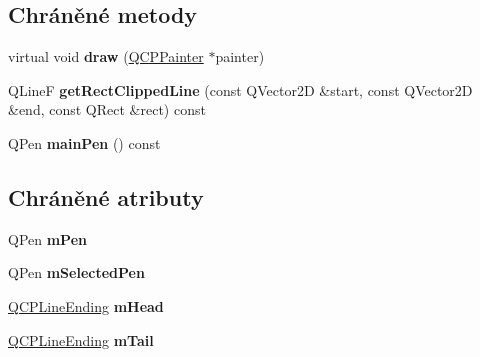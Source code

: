 \subsection*{Chráněné metody}
\begin{DoxyCompactItemize}
\item 
\hypertarget{classQCPItemLine_a1fc045dd33919f8006df0692aeb0e84a}{}virtual void {\bfseries draw} (\hyperlink{classQCPPainter}{Q\+C\+P\+Painter} $\ast$painter)\label{classQCPItemLine_a1fc045dd33919f8006df0692aeb0e84a}

\item 
\hypertarget{classQCPItemLine_a36e8620019a221ccea4357f0287b81c2}{}Q\+Line\+F {\bfseries get\+Rect\+Clipped\+Line} (const Q\+Vector2\+D \&start, const Q\+Vector2\+D \&end, const Q\+Rect \&rect) const \label{classQCPItemLine_a36e8620019a221ccea4357f0287b81c2}

\item 
\hypertarget{classQCPItemLine_a7b5bc4ebacb55774b87c91b308ca7912}{}Q\+Pen {\bfseries main\+Pen} () const \label{classQCPItemLine_a7b5bc4ebacb55774b87c91b308ca7912}

\end{DoxyCompactItemize}
\subsection*{Chráněné atributy}
\begin{DoxyCompactItemize}
\item 
\hypertarget{classQCPItemLine_abbb544d5bb927dfe4e81a7f3ca4c65ac}{}Q\+Pen {\bfseries m\+Pen}\label{classQCPItemLine_abbb544d5bb927dfe4e81a7f3ca4c65ac}

\item 
\hypertarget{classQCPItemLine_aff858ad6dde3b90024814ca4b116f278}{}Q\+Pen {\bfseries m\+Selected\+Pen}\label{classQCPItemLine_aff858ad6dde3b90024814ca4b116f278}

\item 
\hypertarget{classQCPItemLine_a51603f28ab7ddb1c1a95ea384791d3ed}{}\hyperlink{classQCPLineEnding}{Q\+C\+P\+Line\+Ending} {\bfseries m\+Head}\label{classQCPItemLine_a51603f28ab7ddb1c1a95ea384791d3ed}

\item 
\hypertarget{classQCPItemLine_ab8ed61dfe15bbb1cbf9b95eae95e242f}{}\hyperlink{classQCPLineEnding}{Q\+C\+P\+Line\+Ending} {\bfseries m\+Tail}\label{classQCPItemLine_ab8ed61dfe15bbb1cbf9b95eae95e242f}

\end{DoxyCompactItemize}
